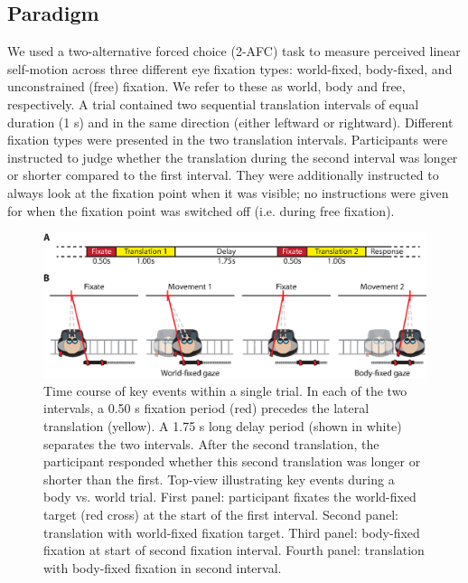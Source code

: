 \subsection{Paradigm}
We used a two-alternative forced choice (2-AFC) task to measure perceived linear self-motion across three different eye fixation types: world-fixed, body-fixed, and unconstrained (free) fixation. We refer to these as world, body and free, respectively. A trial contained two sequential translation intervals of equal duration (1 \si{\second}) and in the same direction (either leftward or rightward). Different fixation types were presented in the two translation intervals. Participants were instructed to judge whether the translation during the second interval was longer or shorter compared to the first interval. They were additionally instructed to always look at the fixation point when it was visible; no instructions were given for when the fixation point was switched off (i.e. during free fixation).

\begin{figure}
    \includegraphics[width=1.0\textwidth]{src/paper3/figure1.eps}

    \caption{ Time course of key events within a single trial. In each of the two intervals, a 0.50 \si{\second} fixation period (red) precedes the lateral translation (yellow). A 1.75 \si{\second} long delay period (shown in white) separates the two intervals. After the second translation, the participant responded whether this second translation was longer or shorter than the first.  Top-view illustrating key events during a body vs. world trial. First panel: participant fixates the world-fixed target (red cross) at the start of the first interval. Second panel: translation with world-fixed fixation target. Third panel: body-fixed fixation at start of second fixation interval. Fourth panel: translation with body-fixed fixation in second interval.}
    \label{p3:fig1}    
\end{figure}

